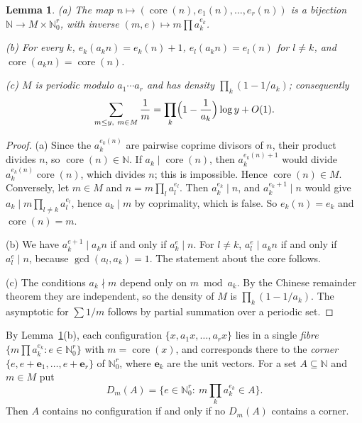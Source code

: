 \documentclass[11pt]{amsart}
\newtheorem{lemma}[theorem]{Lemma}
\theoremstyle{definition}
\newcommand{\N}{\mathbb{N}}
\begin{document}
\begin{lemma}\label{lem:grid}
\textup{(a)} The map $n\mapsto(\operatorname{core}(n),e_1(n),\dots,e_r(n))$ is a bijection $\N\to M\times\N_0^r$, with inverse $(m,e)\mapsto m\prod a_k^{e_k}$.

\textup{(b)} For every $k$, $e_k(a_kn)=e_k(n)+1$, $e_l(a_kn)=e_l(n)$ for $l\ne k$, and $\operatorname{core}(a_kn)=\operatorname{core}(n)$.

\textup{(c)} $M$ is periodic modulo $a_1\cdots a_r$ and has density $\prod_k(1-1/a_k)$; consequently \[\sum_{m\le y,\ m\in M}\frac1m=\prod_k\Bigl(1-\frac1{a_k}\Bigr)\log y+O(1).\]
\end{lemma}

\begin{proof}
(a) Since the $a_k^{e_k(n)}$ are pairwise coprime divisors of $n$, their product divides $n$, so $\operatorname{core}(n)\in\N$. If $a_k\mid\operatorname{core}(n)$, then $a_k^{e_k(n)+1}$ would divide $a_k^{e_k(n)}\operatorname{core}(n)$, which divides $n$; this is impossible. Hence $\operatorname{core}(n)\in M$. Conversely, let $m\in M$ and $n=m\prod_l a_l^{e_l}$. Then $a_k^{e_k}\mid n$, and $a_k^{e_k+1}\mid n$ would give $a_k\mid m\prod_{l\neq k}a_l^{e_l}$, hence $a_k\mid m$ by coprimality, which is false. So $e_k(n)=e_k$ and $\operatorname{core}(n)=m$.

(b) We have $a_k^{e+1}\mid a_kn$ if and only if $a_k^e\mid n$. For $l\ne k$, $a_l^e\mid a_kn$ if and only if $a_l^e\mid n$, because $\gcd(a_l,a_k)=1$. The statement about the core follows.

(c) The conditions $a_k\nmid m$ depend only on $m\bmod a_k$. By the Chinese remainder theorem they are independent, so the density of $M$ is $\prod_k(1-1/a_k)$. The asymptotic for $\sum 1/m$ follows by partial summation over a periodic set.
\end{proof}

By Lemma~\ref{lem:grid}(b), each configuration $\{x,a_1x,\dots,a_rx\}$ lies in a single \emph{fibre} $\{m\prod a_k^{e_k}: e\in\N_0^r\}$ with $m=\operatorname{core}(x)$, and corresponds there to the \emph{corner} $\{e,e+\mathbf e_1,\dots,e+\mathbf e_r\}$ of $\N_0^r$, where $\mathbf e_k$ are the unit vectors. For a set $A\subseteq\N$ and $m\in M$ put
\begin{equation}\label{eq:fibre}
D_m(A)=\{e\in\N_0^r:\ m\textstyle\prod_k a_k^{e_k}\in A\}.
\end{equation}
Then $A$ contains no configuration if and only if no $D_m(A)$ contains a corner.
\end{document}
